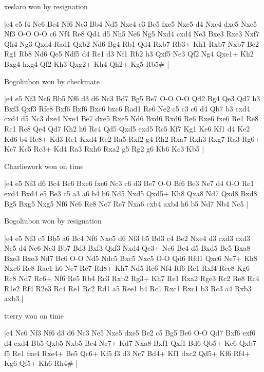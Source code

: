 \showboard

xeslaro won by resignation

\makegametitle
|e4 e5 f4 Nc6 Bc4 Nf6 Nc3 Bb4 Nd5 Nxe4 c3 Bc5 fxe5 Nxe5 d4 Nxc4 dxc5 Nxc5 Nf3 O-O O-O c6 Nf4 Re8 Qd4 d5 Nh5 Ne6 Ng5 Nxd4 cxd4 Ne3 Bxe3 Rxe3 Nxf7 Qh4 Ng3 Qxd4 Rad1 Qxb2 Nd6 Bg4 Rb1 Qd4 Rxb7 Rb3+ Kh1 Rxb7 Nxb7 Be2 Rg1 Rb8 Nd6 Qe5 Ndf5 d4 Re1 d3 Nf1 Rb2 h3 Qxf5 Ne3 Qf2 Ng4 Qxe1+ Kh2 Bxg4 hxg4 Qf2 Kh3 Qxg2+ Kh4 Qh2+ Kg5 Rb5\#  |

\showboard

Bogoliubon won by checkmate

\makegametitle
|e4 e5 Nf3 Nc6 Bb5 Nf6 d3 d6 Nc3 Bd7 Bg5 Be7 O-O O-O Qd2 Bg4 Qe3 Qd7 h3 Bxf3 Qxf3 Rfe8 Bxf6 Bxf6 Bxc6 bxc6 Rad1 Re6 Ne2 c5 c3 c6 d4 Qb7 b3 cxd4 cxd4 d5 Nc3 dxe4 Nxe4 Be7 dxe5 Rxe5 Nd6 Bxd6 Rxd6 Re6 Rxe6 fxe6 Re1 Re8 Rc1 Rc8 Qe4 Qd7 Kh2 h6 Rc4 Qd5 Qxd5 exd5 Rc5 Kf7 Kg1 Ke6 Kf1 d4 Ke2 Kd6 b4 Re8+ Kd3 Re1 Kxd4 Re2 Ra5 Rxf2 g4 Rh2 Rxa7 Rxh3 Rxg7 Ra3 Rg6+ Kc7 Kc5 Rc3+ Kd4 Ra3 Rxh6 Rxa2 g5 Rg2 g6 Kb6 Kc3 Kb5  |

\showboard

Charliework won on time

\makegametitle
|e4 e5 Nf3 d6 Bc4 Be6 Bxe6 fxe6 Nc3 c6 d3 Be7 O-O Bf6 Be3 Ne7 d4 O-O Re1 exd4 Bxd4 e5 Be3 c5 a3 a6 b4 b6 Nd5 Nxd5 Qxd5+ Kh8 Qxa8 Nd7 Qxd8 Bxd8 Bg5 Bxg5 Nxg5 Nf6 Ne6 Re8 Nc7 Re7 Nxa6 cxb4 axb4 h6 b5 Nd7 Nb4 Nc5  |

\showboard

Bogoliubon won by resignation

\makegametitle
|e4 e5 Nf3 c5 Bb5 a6 Bc4 Nf6 Nxe5 d6 Nf3 b5 Bd3 c4 Be2 Nxe4 d3 cxd3 cxd3 Nc5 d4 Ne6 Nc3 Bb7 Bd3 Bxf3 Qxf3 Nxd4 Qe3+ Ne6 Be4 d5 Bxd5 Bc5 Bxa8 Bxe3 Bxe3 Nd7 Bc6 O-O Nd5 Ndc5 Bxc5 Nxc5 O-O Qd6 Rfd1 Qxc6 Ne7+ Kh8 Nxc6 Rc8 Rac1 h6 Ne7 Rc7 Rd8+ Kh7 Nd5 Rc6 Nf4 Rf6 Re1 Rxf4 Ree8 Kg6 Rc8 Nd7 Rc6+ Nf6 Re5 Rb4 Rc3 Rxb2 Rg3+ Kh7 Re1 Rxa2 Rge3 Rc2 Re8 Rc4 R1e2 Rf4 R2e3 Rc4 Re1 Rc2 Rd1 a5 Ree1 b4 Rc1 Rxc1 Rxc1 b3 Rc3 a4 Rxb3 axb3  |

\showboard

tterry won on time

\makegametitle
|e4 Nc6 Nf3 Nf6 d3 d6 Nc3 Ne5 Nxe5 dxe5 Be2 c5 Bg5 Be6 O-O Qd7 Bxf6 exf6 d4 exd4 Bb5 Qxb5 Nxb5 Bc4 Nc7+ Kd7 Nxa8 Bxf1 Qxf1 Bd6 Qb5+ Ke6 Qxb7 f5 Re1 fxe4 Rxe4+ Be5 Qc6+ Kf5 f3 d3 Nc7 Bd4+ Kf1 dxc2 Qd5+ Kf6 Rf4+ Kg6 Qf5+ Kh6 Rh4\#  |

